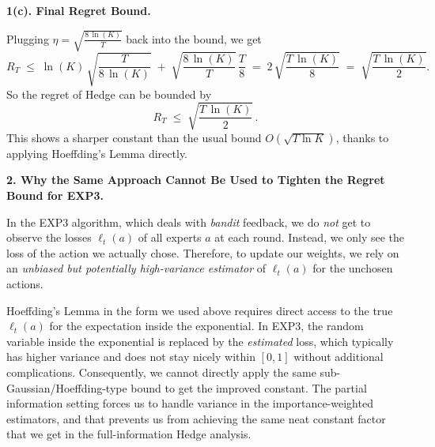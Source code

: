 \bigskip

\noindent
\textbf{1(c). Final Regret Bound.}

\smallskip

Plugging $\eta = \sqrt{\frac{8\,\ln(K)}{T}}$ back into the bound, we get
\[
R_T
\;\le\;
\ln(K)\,\sqrt{\frac{T}{8\,\ln(K)}} \;+\; \sqrt{\frac{8\,\ln(K)}{T}}\,\frac{T}{8}
\;=\;
2\,\sqrt{\frac{T\,\ln(K)}{8}}
\;=\;
\sqrt{\frac{T\,\ln(K)}{2}}.
\]
So the regret of Hedge can be bounded by
\[
\boxed{
R_T 
\;\le\;
\sqrt{\frac{T\,\ln(K)}{2}}
\,.
}
\]
This shows a sharper constant than the usual bound $O(\sqrt{T \ln K})$, thanks to applying Hoeffding's Lemma directly.

\bigskip

\noindent
\textbf{2. Why the Same Approach Cannot Be Used to Tighten the Regret Bound for EXP3.}

\smallskip

In the EXP3 algorithm, which deals with \emph{bandit} feedback, we do \emph{not} get to observe the losses $\ell_t(a)$ of all experts $a$ at each round. Instead, we only see the loss of the action we actually chose. Therefore, to update our weights, we rely on an \emph{unbiased but potentially high-variance estimator} of $\ell_t(a)$ for the unchosen actions. 

Hoeffding's Lemma in the form we used above requires direct access to the true $\ell_t(a)$ for the expectation inside the exponential. In EXP3, the random variable inside the exponential is replaced by the \emph{estimated} loss, which typically has higher variance and does not stay nicely within $[0,1]$ without additional complications. Consequently, we cannot directly apply the same sub-Gaussian/Hoeffding-type bound to get the improved constant. The partial information setting forces us to handle variance in the importance-weighted estimators, and that prevents us from achieving the same neat constant factor that we get in the full-information Hedge analysis.